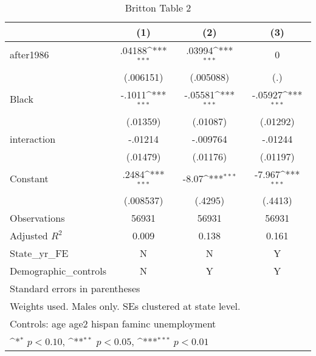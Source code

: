 \begin{table}[htbp]\centering
\def\sym#1{\ifmmode^{#1}\else\(^{#1}\)\fi}
\caption{Britton Table 2}
\begin{tabular}{l*{3}{c}}
\hline\hline
                    &\multicolumn{1}{c}{(1)}         &\multicolumn{1}{c}{(2)}         &\multicolumn{1}{c}{(3)}         \\
\hline
after1986           &      .04188\sym{***}&      .03994\sym{***}&           0         \\
                    &   (.006151)         &   (.005088)         &         (.)         \\
[1em]
Black               &      -.1011\sym{***}&     -.05581\sym{***}&     -.05927\sym{***}\\
                    &    (.01359)         &    (.01087)         &    (.01292)         \\
[1em]
interaction         &     -.01214         &    -.009764         &     -.01244         \\
                    &    (.01479)         &    (.01176)         &    (.01197)         \\
[1em]
Constant            &       .2484\sym{***}&       -8.07\sym{***}&      -7.967\sym{***}\\
                    &   (.008537)         &     (.4295)         &     (.4413)         \\
\hline
Observations        &       56931         &       56931         &       56931         \\
Adjusted \(R^{2}\)  &       0.009         &       0.138         &       0.161         \\
State\_yr\_FE         &           N         &           N         &           Y         \\
Demographic\_controls&           N         &           Y         &           Y         \\
\hline\hline
\multicolumn{4}{l}{\footnotesize Standard errors in parentheses}\\
\multicolumn{4}{l}{\footnotesize Weights used. Males only. SEs clustered at state level.}\\
\multicolumn{4}{l}{\footnotesize Controls: age age2 hispan faminc unemployment}\\
\multicolumn{4}{l}{\footnotesize \sym{*} \(p<0.10\), \sym{**} \(p<0.05\), \sym{***} \(p<0.01\)}\\
\end{tabular}
\end{table}

